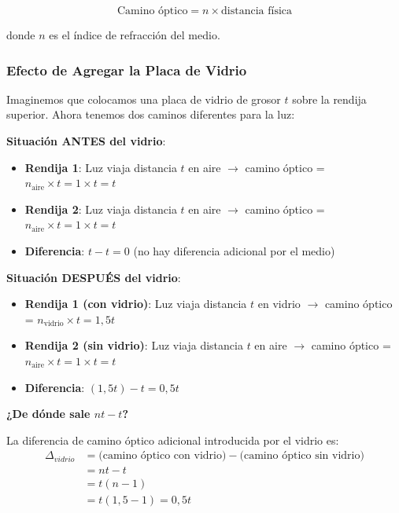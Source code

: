 \documentclass[
  11pt,
  letterpaper,
   addpoints,
   answers
  ]{exam}
\begin{document}
\begin{questions}
\begin{solution}
\begin{equation}
\text{Camino óptico} = n \times \text{distancia física}
\end{equation}

donde $n$ es el índice de refracción del medio.

\subsubsection*{Efecto de Agregar la Placa de Vidrio}

Imaginemos que colocamos una placa de vidrio de grosor $t$ sobre la rendija superior. Ahora tenemos dos caminos diferentes para la luz:

\textbf{Situación ANTES del vidrio}:
\begin{itemize}
    \item \textbf{Rendija 1}: Luz viaja distancia $t$ en aire $\rightarrow$ camino óptico = $n_{\text{aire}} \times t = 1 \times t = t$
    \item \textbf{Rendija 2}: Luz viaja distancia $t$ en aire $\rightarrow$ camino óptico = $n_{\text{aire}} \times t = 1 \times t = t$
    \item \textbf{Diferencia}: $t - t = 0$ (no hay diferencia adicional por el medio)
\end{itemize}

\textbf{Situación DESPUÉS del vidrio}:
\begin{itemize}
    \item \textbf{Rendija 1 (con vidrio)}: Luz viaja distancia $t$ en vidrio $\rightarrow$ camino óptico = $n_{\text{vidrio}} \times t = 1{,}5t$
    \item \textbf{Rendija 2 (sin vidrio)}: Luz viaja distancia $t$ en aire $\rightarrow$ camino óptico = $n_{\text{aire}} \times t = 1 \times t = t$
    \item \textbf{Diferencia}: $(1{,}5t) - t = 0{,}5t$
\end{itemize}

\textbf{¿De dónde sale $nt - t$?}

La diferencia de camino óptico adicional introducida por el vidrio es:
\begin{align}
\Delta_{vidrio} &= \text{(camino óptico con vidrio)} - \text{(camino óptico sin vidrio)} \\
&= nt - t \\
&= t(n - 1) \\
&= t(1{,}5 - 1) = 0{,}5t
\end{align}


\end{solution}
\end{questions}
\end{document}
